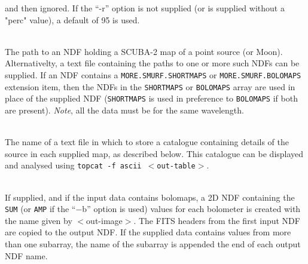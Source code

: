 \documentclass[twoside,11pt]{article}
\renewcommand{\_}{\texttt{\symbol{95}}}
\newcommand{\sstsubsection}[1]{ \item[{#1}] \mbox{} \\}
\newcommand{\sstsubsection}[1]{\item[{#1}]}
\begin{document}
{{{      and then ignored. If the ``-r'' option is not supplied (or is supplied
      without a "perc" value), a default of 95 is used.
    }
    \sstsubsection{
      $<$in-list$>$
    }{
      The path to an NDF holding a SCUBA-2 map of a point
      source (or Moon). Alternativelty, a text file containing the
      paths to one or more such NDFs can be supplied. If an NDF
      contains a \texttt{MORE.SMURF.SHORTMAPS} or \texttt{MORE.SMURF.BOLOMAPS}
      extension item, then the NDFs in the \texttt{SHORTMAPS} or \texttt{BOLOMAPS}
      array are used in place of the supplied NDF (\texttt{SHORTMAPS} is used
      in preference to \texttt{BOLOMAPS} if both are present). \textit{Note}, all the
      data must be for the same wavelength.
    }
    \sstsubsection{
      $<$out-table$>$
    }{
      The name of a text file in which to store a
      catalogue containing details of the source in each
      supplied map, as described below. This catalogue can
      be displayed and analysed using \texttt{topcat -f ascii
        $<$out-table$>$}.
    }
    \sstsubsection{
      $<$out-image$>$
    }{
      If supplied, and if the input data contains bolomaps,
      a 2D NDF containing the \texttt{SUM} (or \texttt{AMP} if the ``$-$b'' option is used)
      values for each bolometer is created with the name given by
      $<$out-image$>$. The FITS headers from the first input NDF are
      copied to the output NDF. If the supplied data contains values
      from more than one subarray, the name of the subarray is appended
      the end of each output NDF name.
    }
  }
}
\end{document}
